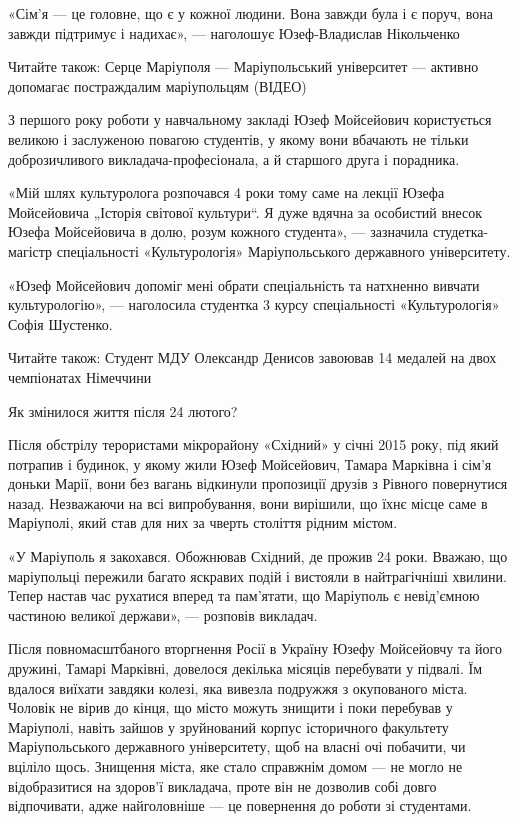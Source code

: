 «Сім'я — це головне, що є у кожної людини. Вона завжди була і є поруч, вона
завжди підтримує і надихає», — наголошує Юзеф-Владислав Нікольченко

Читайте також: Серце Маріуполя — Маріупольський університет — активно допомагає
постраждалим маріупольцям (ВІДЕО)

З першого року роботи у навчальному закладі Юзеф Мойсейович користується
великою і заслуженою повагою студентів, у якому вони вбачають не тільки
доброзичливого викладача-професіонала, а й старшого друга і порадника.

«Мій шлях культуролога розпочався 4 роки тому саме на лекції Юзефа Мойсейовича
„Історія світової культури“. Я дуже вдячна за особистий внесок Юзефа
Мойсейовича в долю, розум кожного студента», — зазначила студетка-магістр
спеціальності «Культурологія» Маріупольського державного університету.

«Юзеф Мойсейович допоміг мені обрати спеціальність та натхненно вивчати
культурологію», — наголосила студентка 3 курсу спеціальності «Культурологія»
Софія Шустенко.

Читайте також: Студент МДУ Олександр Денисов завоював 14 медалей на двох
чемпіонатах Німеччини

Як змінилося життя після 24 лютого? 

Після обстрілу терористами мікрорайону «Східний» у січні 2015 року, під який
потрапив і будинок, у якому жили Юзеф Мойсейович, Тамара Марківна і сім'я
доньки Марії, вони без вагань відкинули пропозиції друзів з Рівного повернутися
назад. Незважаючи на всі випробування, вони вирішили, що їхнє місце саме в
Маріуполі, який став для них за чверть століття рідним містом.

«У Маріуполь я закохався. Обожнював Східний, де прожив 24 роки. Вважаю, що
маріупольці пережили багато яскравих подій і вистояли в найтрагічніші хвилини.
Тепер настав час рухатися вперед та пам’ятати, що Маріуполь є невід'ємною
частиною великої держави», — розповів викладач. 

Після повномасштбаного вторгнення Росії в Україну Юзефу Мойсейовчу та його
дружині, Тамарі Марківні, довелося декілька місяців перебувати у підвалі. Їм
вдалося виїхати завдяки колезі, яка вивезла подружжя з окупованого міста.
Чоловік не вірив до кінця, що місто можуть знищити і поки перебував у
Маріуполі, навіть зайшов у зруйнований корпус історичного факультету
Маріупольського державного університету, щоб на власні очі побачити, чи вціліло
щось. Знищення міста, яке стало справжнім домом — не могло не відобразитися на
здоров'ї викладача, проте він не дозволив собі довго відпочивати, адже
найголовніше — це повернення до роботи зі студентами.

